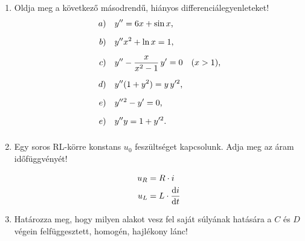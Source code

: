 \documentclass{szb-practice}
\begin{document}
\begin{enumerate}
  \item Oldja meg a következő másodrendű, hiányos differenciálegyenleteket!
        \begin{align*}
          a) \quad y'' & = 6x + \sin x
          \text,                                                     \\[2mm]
          b) \quad y'' & x^2 + \ln x = 1
          \text,                                                     \\[2mm]
          c) \quad y'' & - \frac{x}{x^2 - 1} \, y' = 0 \quad (x > 1)
          \text,                                                     \\[2mm]
          d) \quad y'' & (1 + y^2) = y \, y'^2
          \text,                                                     \\[2mm]
          e) \quad y'' & {}^2 - y' = 0
          \text,                                                     \\[2mm]
          e) \quad y'' & y = 1 + y'^2
          \text.                                                     \\[2mm]
        \end{align*}

  \item Egy soros RL-körre konstans $u_0$ feszültséget kapcsolunk. Adja meg
        az áram időfüggvényét!

        \begin{minipage}{.25\textwidth}
          \centering
        \end{minipage}\begin{minipage}{.4\textwidth}
          \begin{align*}
            u_R & = R \cdot i
            \\
            u_L & = L \cdot \odv{i}{t}
          \end{align*}
        \end{minipage}

  \item Határozza meg, hogy milyen alakot vesz fel saját súlyának hatására a $C$
        és $D$ végein felfüggesztett, homogén, hajlékony lánc!


\end{enumerate}
\end{document}
